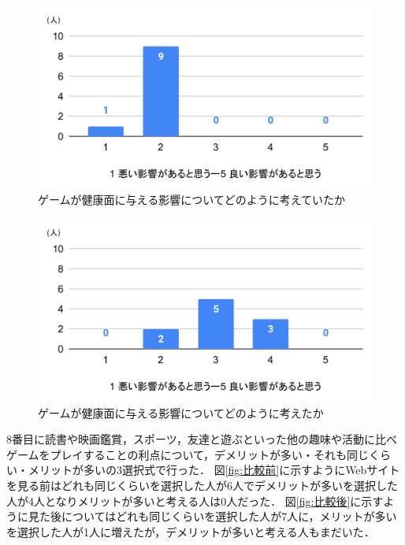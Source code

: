 \documentclass[12pt,a4j,titlepage]{ltjsarticle}
\begin{document}
\begin{figure}[H]
 \begin{center}
  \includegraphics[keepaspectratio, scale=0.6]{PDF/健康前.pdf}
 \end{center}
 \caption{ゲームが健康面に与える影響についてどのように考えていたか}
 \label{fig:健康前}
\end{figure}

\begin{figure}[H]
 \begin{center}
  \includegraphics[keepaspectratio, scale=0.6]{PDF/健康後.pdf}
 \end{center}
 \caption{ゲームが健康面に与える影響についてどのように考えたか}
 \label{fig:健康後}
\end{figure}

8番目に読書や映画鑑賞，スポーツ，友達と遊ぶといった他の趣味や活動に比べゲームをプレイすることの利点について，デメリットが多い・それも同じくらい・メリットが多いの3選択式で行った．
図\ref{fig:比較前}に示すようにWebサイトを見る前はどれも同じくらいを選択した人が6人でデメリットが多いを選択した人が4人となりメリットが多いと考える人は0人だった．
図\ref{fig:比較後}に示すように見た後についてはどれも同じくらいを選択した人が7人に，メリットが多いを選択した人が1人に増えたが，デメリットが多いと考える人もまだいた．
\end{document}
